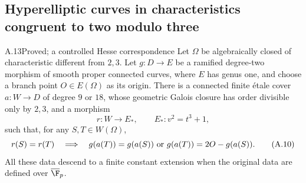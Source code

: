 \subsection{Hyperelliptic curves in characteristics congruent to two modulo three}

\begin{claim}{A.13}{Proved; a controlled Hesse correspondence}
Let $\Omega$ be algebraically closed of characteristic different
from $2,3$. Let $g:D\to E$ be a ramified degree-two morphism
of smooth proper connected curves, where $E$ has genus one,
and choose a branch point $O\in E(\Omega)$ as its origin.
There is a connected finite \'etale cover $a:W\to D$ of
degree $9$ or $18$, whose geometric Galois closure has order
divisible only by $2,3$, and a morphism
\[
 r:W\longrightarrow E_* ,\qquad E_*:v^2=t^3+1,
\]
such that, for any $S,T\in W(\Omega)$,
\[
 r(S)=r(T)\quad\Longrightarrow\quad
 g(a(T))=g(a(S))\ \hbox{or}\ g(a(T))=2O-g(a(S)).                 \tag{A.10}
\]
All these data descend to a finite constant extension when the
original data are defined over $\overline{\F}_p$.
\end{claim}
